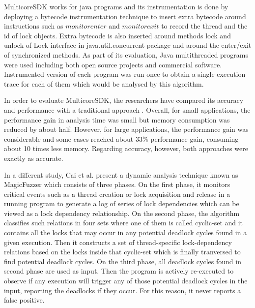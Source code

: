 MulticoreSDK works for java programs and its instrumentation is done by deploying a bytecode instrumentation technique \cite{tanter} to insert extra bytecode around instructions
such as $monitorenter$ and $monitorexit$
to record the thread and the id of lock objects. Extra bytecode is also inserted around methods lock and unlock of Lock interface in java.util.concurrent package and around the enter/exit of synchronized methods.
As part of its evaluation, Java multithreaded programs were used including both open source projects and commercial software. Instrumented version of each program was run
once to obtain a single execution trace for each of them which would be analysed by this algorithm.

In order to evaluate MulticoreSDK, the researchers have compared its accuracy and performance with a traditional approach \cite{contest}. 
Overall, for small applications, the performance gain in analysis time was small but memory consumption was reduced by about half. However, for large applications, the performance gain was considerable and some cases reached about 33\% performance gain, consuming about 10 times less memory. Regarding accuracy, however, both approaches were exactly as accurate.

In a different study, Cai et al. \cite{magicfuzzer}
present a dynamic analysis technique known as MagicFuzzer which consists of three phases. On the first phase, it monitors critical events such as a thread
creation or lock acquisition and release in a running program to generate a log of series of lock dependencies which can be viewed as a lock dependency relationship.
On the second phase, the algorithm classifies such relations in four sets where one of them is called cyclic-set and it contains all the locks that may occur in any
potential deadlock cycles found in a given execution. Then it constructs
a set of thread-specific lock-dependency relations based on the locks inside that cyclic-set which is finally tranversed to find potential deadlock cycles.
On the third phase, all deadlock cycles found in second phase are used as input. Then the program is actively re-executed to observe if any execution will trigger any of those
potential deadlock cycles in the input, reporting the deadlocks if they occur. For this reason, it never reports a false positive.

